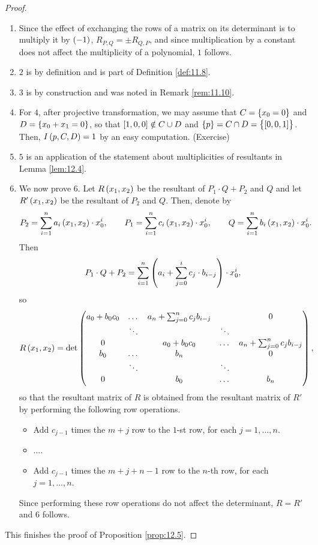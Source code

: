 \begin{proof}
\hfill
\begin{enumerate}
\item Since the effect of exchanging the rows of a matrix on its determinant is to multiply it by $ \br{-1} $, $ R_{P, Q} = \pm R_{Q, P} $, and since multiplication by a constant does not affect the multiplicity of a polynomial, $ 1 $ follows.
\item $ 2 $ is by definition and is part of Definition \ref{def:11.8}.
\item $ 3 $ is by construction and was noted in Remark \ref{rem:11.10}.
\item For $ 4 $, after projective transformation, we may assume that $ C = \cbr{x_0 = 0} $ and $ D = \cbr{x_0 + x_1 = 0} $, so that $ \sbr{1, 0, 0} \notin C \cup D $ and $ \cbr{p} = C \cap D = \cbr{\sbr{0, 0, 1}} $. Then, $ I\br{p, C, D} = 1 $ by an easy computation. (Exercise)
\item $ 5 $ is an application of the statement about multiplicities of resultants in Lemma \ref{lem:12.4}.
\item We now prove $ 6 $. Let $ R\br{x_1, x_2} $ be the resultant of $ P_1 \cdot Q + P_2 $ and $ Q $ and let $ R'\br{x_1, x_2} $ be the resultant of $ P_2 $ and $ Q $. Then, denote by
$$ P_2 = \sum_{i = 1}^n a_i\br{x_1, x_2} \cdot x_0^i, \qquad P_1 = \sum_{i = 1}^n c_i\br{x_1, x_2} \cdot x_0^i, \qquad Q = \sum_{i = 1}^n b_i\br{x_1, x_2} \cdot x_0^i. $$
Then
$$ P_1 \cdot Q + P_2 = \sum_{i = 1}^n \br{a_i + \sum_{j = 0}^i c_j \cdot b_{i - j}} \cdot x_0^i, $$
so
$$ R\br{x_1, x_2} = \det
\begin{pmatrix}
a_0 + b_0c_0 & \dots & a_n + \sum_{j = 0}^n c_jb_{i - j} & & 0 \\
& \ddots & & \ddots & \\
0 & & a_0 + b_0c_0 & \dots & a_n + \sum_{j = 0}^n c_jb_{i - j} \\
b_0 & \dots & b_n & & 0 \\
& \ddots & & \ddots & \\
0 & & b_0 & \dots & b_n
\end{pmatrix},
$$
so that the resultant matrix of $ R $ is obtained from the resultant matrix of $ R' $ by performing the following row operations.
\begin{itemize}
\item Add $ c_{j - 1} $ times the $ m + j $ row to the $ 1 $-st row, for each $ j = 1, \dots, n $.
\item $ \dots $.
\item Add $ c_{j - 1} $ times the $ m + j + n - 1 $ row to the $ n $-th row, for each $ j = 1, \dots, n $.
\end{itemize}
Since performing these row operations do not affect the determinant, $ R = R' $ and $ 6 $ follows.
\end{enumerate}
This finishes the proof of Proposition \ref{prop:12.5}.
\end{proof}


